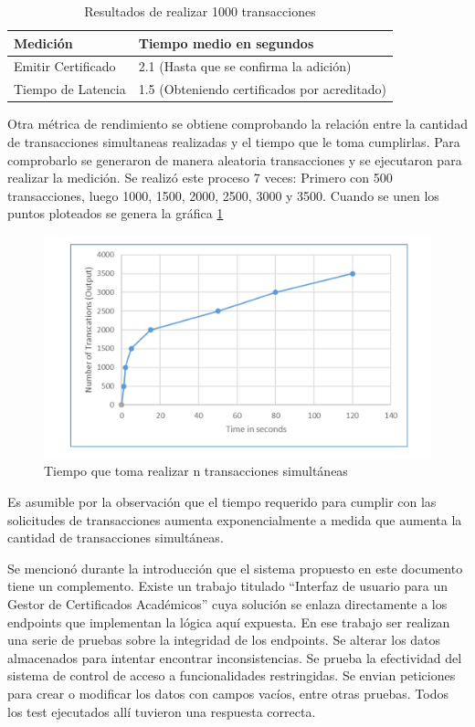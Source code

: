 \begin{table}[!h]
	\caption{Resultados de realizar 1000 transacciones}
	\label{tab:1}
	\begin{tabular}{ll} \toprule
		\textbf{Medición} & \textbf{Tiempo medio en segundos} \\ \midrule
		Emitir Certificado & 2.1 (Hasta que se confirma la adición)  \\
		Tiempo de Latencia & 1.5 (Obteniendo certificados por acreditado)  \\ \bottomrule
	\end{tabular}
\end{table}

Otra métrica de rendimiento se obtiene comprobando la relación entre la cantidad de transacciones simultaneas realizadas y el tiempo que le toma cumplirlas. Para comprobarlo se generaron de manera aleatoria transacciones y se ejecutaron para realizar la medición. Se realizó este proceso 7 veces: Primero con 500 transacciones, luego 1000, 1500, 2000, 2500, 3000 y 3500. Cuando se unen los puntos ploteados se genera la gráfica \ref{fig:13}

\begin{figure}[h!]
	\centering
	\includegraphics[width=\linewidth]{Graphics/plot.png}
	\caption{Tiempo que toma realizar n transacciones simultáneas}
	\label{fig:13}
\end{figure}

Es asumible por la observación que el tiempo requerido para cumplir con las solicitudes de transacciones aumenta exponencialmente a medida que aumenta la cantidad de transacciones simultáneas.

Se mencionó durante la introducción que el sistema propuesto en este documento tiene un complemento. Existe un trabajo titulado ``Interfaz de usuario para un Gestor de Certificados Académicos'' cuya solución se enlaza directamente a los endpoints que implementan la lógica aquí expuesta. En ese trabajo ser realizan una serie de pruebas sobre la integridad de los endpoints. Se alterar los datos almacenados para intentar encontrar inconsistencias. Se prueba la efectividad del sistema de control de acceso a funcionalidades restringidas. Se envian peticiones para crear o modificar los datos con campos vacíos, entre otras pruebas. Todos los test ejecutados allí tuvieron una respuesta correcta.